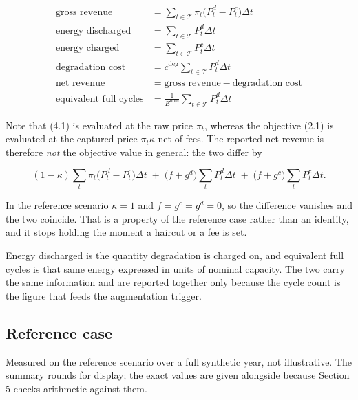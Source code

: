 \documentclass[11pt,a4paper]{article}
\numberwithin{equation}{section}
\begin{document}
\begin{align}
\text{gross revenue} &= \sum_{t \in \mathcal{T}} \pi_t \big( P^{d}_{t} - P^{c}_{t} \big) \Delta t \\
\text{energy discharged} &= \sum_{t \in \mathcal{T}} P^{d}_{t} \Delta t \\
\text{energy charged} &= \sum_{t \in \mathcal{T}} P^{c}_{t} \Delta t \\
\text{degradation cost} &= c^{\deg} \sum_{t \in \mathcal{T}} P^{d}_{t} \Delta t \\
\text{net revenue} &= \text{gross revenue} - \text{degradation cost} \\
\text{equivalent full cycles} &= \frac{1}{E^{\text{nom}}} \sum_{t \in \mathcal{T}} P^{d}_{t} \Delta t
\end{align}

Note that (4.1) is evaluated at the raw price $\pi_t$, whereas the objective
(2.1) is evaluated at the captured price $\pi_t \kappa$ net of fees. The
reported net revenue is therefore \emph{not} the objective value in general:
the two differ by

\begin{equation}
(1 - \kappa) \sum_{t} \pi_t \big( P^{d}_{t} - P^{c}_{t} \big) \Delta t
\; + \; \big( f + g^{d} \big) \sum_{t} P^{d}_{t} \Delta t
\; + \; \big( f + g^{c} \big) \sum_{t} P^{c}_{t} \Delta t .
\end{equation}

In the reference scenario $\kappa = 1$ and $f = g^{c} = g^{d} = 0$, so the
difference vanishes and the two coincide. That is a property of the reference
case rather than an identity, and it stops holding the moment a haircut or a fee
is set.

Energy discharged is the quantity degradation is charged on, and equivalent full
cycles is that same energy expressed in units of nominal capacity. The two carry
the same information and are reported together only because the cycle count is
the figure that feeds the augmentation trigger.

\subsection{Reference case}

Measured on the reference scenario over a full synthetic year, not illustrative.
The summary rounds for display; the exact values are given alongside because
Section 5 checks arithmetic against them.
\end{document}
